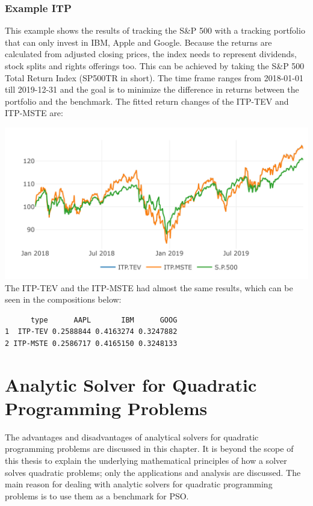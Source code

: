 \documentclass[
  oneside]{book}
\begin{document}
\hypertarget{example-itp}{%
\subsection{Example ITP}\label{example-itp}}

This example shows the results of tracking the S\&P 500 with a tracking portfolio that can only invest in IBM, Apple and Google. Because the returns are calculated from adjusted closing prices, the index needs to represent dividends, stock splits and rights offerings too. This can be achieved by taking the S\&P 500 Total Return Index (SP500TR in short). The time frame ranges from 2018-01-01 till 2019-12-31 and the goal is to minimize the difference in returns between the portfolio and the benchmark. The fitted return changes of the ITP-TEV and ITP-MSTE are:

\includegraphics{Master_Thesis_files/figure-latex/ITP_ex-1.png}
The ITP-TEV and the ITP-MSTE had almost the same results, which can be seen in the compositions below:

\begin{verbatim}
      type      AAPL       IBM      GOOG
1  ITP-TEV 0.2588844 0.4163274 0.3247882
2 ITP-MSTE 0.2586717 0.4165150 0.3248133
\end{verbatim}

\hypertarget{analytic-solver-for-quadratic-programming-problems}{%
\chapter{Analytic Solver for Quadratic Programming Problems}\label{analytic-solver-for-quadratic-programming-problems}}

The advantages and disadvantages of analytical solvers for quadratic programming problems are discussed in this chapter. It is beyond the scope of this thesis to explain the underlying mathematical principles of how a solver solves quadratic problems; only the applications and analysis are discussed. The main reason for dealing with analytic solvers for quadratic programming problems is to use them as a benchmark for PSO.
\end{document}
